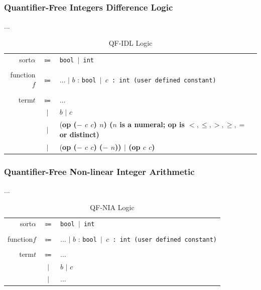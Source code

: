 \documentclass[10pt,letter]{article}
\theoremstyle{definition}
\begin{document}
\subsubsection{Quantifier-Free Integers Difference Logic}
...

\begin{table}[!h]
\begin{mdframed}
\centering
\begin{tabular}{r c l}
sort\qquad $\alpha$ & $\Coloneqq$ & \tt bool $\mid$ int\\
\\
function\qquad $f$ & $\Coloneqq$ & $\ldots$ $\mid$ \rm $b$ : \tt bool $\mid$ \rm $c$ : \tt int \qquad(\rm user defined constant)\\
\\
term\qquad $t$ & $\Coloneqq$ & $\ldots$ \\
& $\mid$ & $b$ $\mid$ $c$\\
& $\mid$ & (\bf op \rm ($-$ $c$ $c$) $n$) \qquad($n$ is a numeral; \bf op \rm is $<, \leqslant, >, \geqslant, =$ or \bf distinct\rm)\\
& $\mid$ & (\bf op \rm ($-$ $c$ $c$) ($-$ $n$)) $\mid$ (\bf op \rm $c$ $c$)\\
\end{tabular}
\end{mdframed}
\caption{QF-IDL Logic}
\end{table}

\subsubsection{Quantifier-Free Non-linear Integer Arithmetic}
...

\begin{table}[!h]
\begin{mdframed}
\centering
\begin{tabular}{r c l}
sort\qquad $\alpha$ & $\Coloneqq$ & \tt bool $\mid$ int\\
\\
function\qquad $f$ & $\Coloneqq$ & $\ldots$ $\mid$ \rm $b$ : \tt bool $\mid$ \rm $c$ : \tt int \qquad(\rm user defined constant)\\
\\
term\qquad $t$ & $\Coloneqq$ & $\ldots$ \\
& $\mid$ & $b$ $\mid$ $c$\\
& $\mid$ & $\ldots$\\
\end{tabular}
\end{mdframed}
\caption{QF-NIA Logic}
\end{table}
\end{document}
